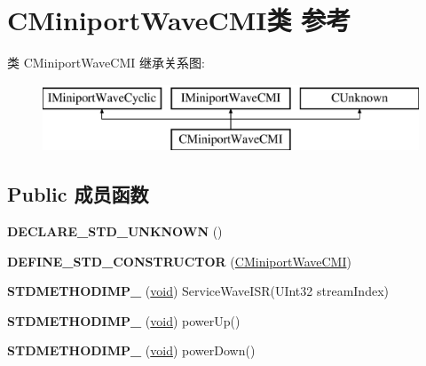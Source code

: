 \hypertarget{class_c_miniport_wave_c_m_i}{}\section{C\+Miniport\+Wave\+C\+M\+I类 参考}
\label{class_c_miniport_wave_c_m_i}
类 C\+Miniport\+Wave\+C\+MI 继承关系图\+:\begin{figure}[H]
\begin{center}
\leavevmode
\includegraphics[height=2.000000cm]{class_c_miniport_wave_c_m_i}
\end{center}
\end{figure}
\subsection*{Public 成员函数}
\begin{DoxyCompactItemize}
\item 
\mbox{\label{class_c_miniport_wave_c_m_i_a976091148e6e7cfb98667cb17c0bbae0}} 
{\bfseries D\+E\+C\+L\+A\+R\+E\+\_\+\+S\+T\+D\+\_\+\+U\+N\+K\+N\+O\+WN} ()
\item 
\mbox{\label{class_c_miniport_wave_c_m_i_a1a3b6690ce06524db37b586f7a80bbbd}} 
{\bfseries D\+E\+F\+I\+N\+E\+\_\+\+S\+T\+D\+\_\+\+C\+O\+N\+S\+T\+R\+U\+C\+T\+OR} (\hyperlink{class_c_miniport_wave_c_m_i}{C\+Miniport\+Wave\+C\+MI})
\item 
\mbox{\label{class_c_miniport_wave_c_m_i_ab576da631bda5f0fcba91f1b31a82862}} 
{\bfseries S\+T\+D\+M\+E\+T\+H\+O\+D\+I\+M\+P\+\_\+} (\hyperlink{interfacevoid}{void}) Service\+Wave\+I\+SR(U\+Int32 stream\+Index)
\item 
\mbox{\label{class_c_miniport_wave_c_m_i_a820b8a7c3d8e74a84733e9c58e5afa7a}} 
{\bfseries S\+T\+D\+M\+E\+T\+H\+O\+D\+I\+M\+P\+\_\+} (\hyperlink{interfacevoid}{void}) power\+Up()
\item 
\mbox{\label{class_c_miniport_wave_c_m_i_afc429e9be6f466221e70da42bb3546bc}} 
{\bfseries S\+T\+D\+M\+E\+T\+H\+O\+D\+I\+M\+P\+\_\+} (\hyperlink{interfacevoid}{void}) power\+Down()
\end{DoxyCompactItemize}
